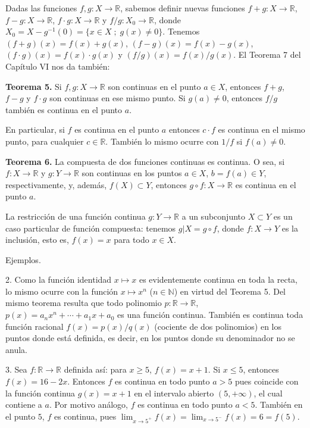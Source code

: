 \documentclass[12pt,oneside]{book}
\begin{document}
Dadas las funciones \(f, g: X \to \mathbb{R}\), sabemos definir nuevas funciones \(f + g: X \to \mathbb{R}\), \(f - g: X \to \mathbb{R}\), \(f \cdot g: X \to \mathbb{R}\) y \(f/g: X_0 \to \mathbb{R}\), donde \(X_0 = X - g^{-1}(0) = \{x \in X \; ; \; g(x) \neq 0\}\). Tenemos \((f + g)(x) = f(x) + g(x)\), \((f - g)(x) = f(x) - g(x)\), \((f \cdot g)(x) = f(x) \cdot g(x)\) y \((f/g)(x) = f(x)/g(x)\). El Teorema 7 del Capítulo VI nos da también:

\textbf{Teorema 5.} Si \(f, g: X \to \mathbb{R}\) son continuas en el punto \(a \in X\), entonces \(f + g\), \(f - g\) y \(f \cdot g\) son continuas en ese mismo punto. Si \(g(a) \neq 0\), entonces \(f/g\) también es continua en el punto \(a\).

En particular, si \(f\) es continua en el punto \(a\) entonces \(c \cdot f\) es continua en el mismo punto, para cualquier \(c \in \mathbb{R}\). También lo mismo ocurre con \(1/f\) si \(f(a) \neq 0\).

\textbf{Teorema 6.} La compuesta de dos funciones continuas es continua. O sea, si \(f: X \to \mathbb{R}\) y \(g: Y \to \mathbb{R}\) son continuas en los puntos \(a \in X\), \(b = f(a) \in Y\), respectivamente, y, además, \(f(X) \subset Y\), entonces \(g \circ f: X \to \mathbb{R}\) es continua en el punto \(a\).

La restricción de una función continua \(g: Y \to \mathbb{R}\) a un subconjunto \(X \subset Y\) es un caso particular de función compuesta: tenemos \(g|X = g \circ f\), donde \(f: X \to Y\) es la inclusión, esto es, \(f(x) = x\) para todo \(x \in X\).

Ejemplos.

2. Como la función identidad \(x \mapsto x\) es evidentemente continua en toda la recta, lo mismo ocurre con la función \(x \mapsto x^n\) (\(n \in \mathbb{N}\)) en virtud del Teorema 5. Del mismo teorema resulta que todo polinomio \(p: \mathbb{R} \to \mathbb{R}\), \(p(x) = a_n x^n + \cdots + a_1 x + a_0\) es una función continua. También es continua toda función racional \(f(x) = p(x)/q(x)\) (cociente de dos polinomios) en los puntos donde está definida, es decir, en los puntos donde su denominador no se anula.

3. Sea \(f: \mathbb{R} \to \mathbb{R}\) definida así: para \(x \geq 5\), \(f(x) = x + 1\). Si \(x \leq 5\), entonces \(f(x) = 16 - 2x\). Entonces \(f\) es continua en todo punto \(a > 5\) pues coincide con la función continua \(g(x) = x + 1\) en el intervalo abierto \((5, +\infty)\), el cual contiene a \(a\). Por motivo análogo, \(f\) es continua en todo punto \(a < 5\). También en el punto \(5\), \(f\) es continua, pues \(\lim_{x \to 5^+} f(x) = \lim_{x \to 5^-} f(x) = 6 = f(5)\).
\end{document}
